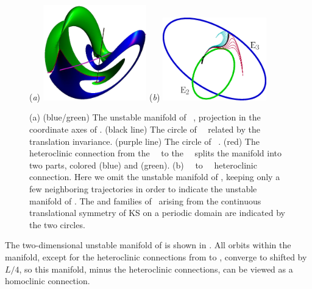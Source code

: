 \begin{figure}[t]
\begin{center}
(\textit{a}) \includegraphics[width=0.4\textwidth, clip=true]{figs/ks22manifold1.eps}
(\textit{b}) \includegraphics[width=0.4\textwidth, clip=true]{figs/ks22E2-E3hetero.eps}
\end{center}
\caption{
(a) (blue/green) The unstable manifold of ~\eqv, projection
	in the coordinate axes of .
    (black line) The circle of ~\eqva\
related by the translation invariance.
(purple line) The circle  of ~\eqva.
(red) The heteroclinic connection
from the ~\eqv\ to the ~\eqv\ splits
the manifold into two parts,
colored (blue) and (green).
(b) ~\eqv\ to ~\eqv\ heteroclinic
connection. Here we omit the unstable manifold of ,
keeping only a few neighboring trajectories in order to indicate
the unstable manifold of . The \EQV{2} and \EQV{3}
families of \eqva\ arising from the continuous translational
symmetry of KS on a periodic domain are indicated by the two circles.
        }
\label{f:KS22Manifold}
\end{figure}

The two-dimensional unstable manifold of  is shown in
.  All orbits within the manifold, except
for the heteroclinic connections from  to , converge
to \EQV{2} shifted by $L/4$,
so this manifold, minus the heteroclinic connections, can be viewed as
a homoclinic connection.  %

